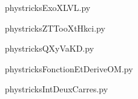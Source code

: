     

    \clearpage
    


    \newcommand{\CaptionFigExoXLVL}{<+Type your caption here+>}
    \begin{center}
        
    \end{center}
    phystricksExoXLVL.py

    

    \clearpage
    


    \newcommand{\CaptionFigZTTooXtHkci}{<+Type your caption here+>}
    \begin{center}
        
    \end{center}
    phystricksZTTooXtHkci.py

    

    \clearpage
    


    \newcommand{\CaptionFigQXyVaKD}{<+Type your caption here+>}
    \begin{center}
        
    \end{center}
    phystricksQXyVaKD.py

    

    \clearpage
    


    \newcommand{\CaptionFigFonctionEtDeriveOM}{<+Type your caption here+>}
    \begin{center}
        
    \end{center}
    phystricksFonctionEtDeriveOM.py

    

    \clearpage
    


    \newcommand{\CaptionFigIntDeuxCarres}{<+Type your caption here+>}
    \begin{center}
        
    \end{center}
    phystricksIntDeuxCarres.py

    

    \clearpage
    


